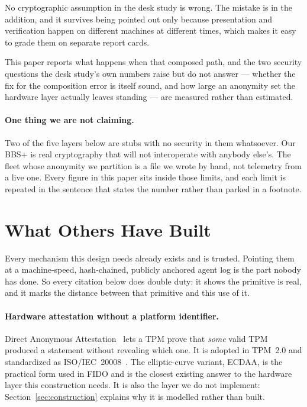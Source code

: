 \documentclass[11pt]{article}
\begin{document}
No cryptographic assumption in the desk study is wrong. The mistake is in the
addition, and it survives being pointed out only because presentation and
verification happen on different machines at different times, which makes it
easy to grade them on separate report cards.

This paper reports what happens when that composed path, and the two
security questions the desk study's own numbers raise but do not answer ---
whether the fix for the composition error is itself sound, and how large an
anonymity set the hardware layer actually leaves standing --- are measured
rather than estimated.

\paragraph{One thing we are not claiming.} Two of the five layers below are
stubs with no security in them whatsoever. Our BBS+ is real cryptography that
will not interoperate with anybody else's. The fleet whose anonymity we
partition is a file we wrote by hand, not telemetry from a live one. Every
figure in this paper sits inside those limits, and each limit is repeated in
the sentence that states the number rather than parked in a footnote.

\section{What Others Have Built}
\label{sec:related}

Every mechanism this design needs already exists and is trusted. Pointing
them at a machine-speed, hash-chained, publicly anchored agent log is the
part nobody has done. So every citation below does double duty: it shows the
primitive is real, and it marks the distance between that primitive and this
use of it.

\paragraph{Hardware attestation without a platform identifier.} Direct
Anonymous Attestation~\cite{daa} lets a TPM prove that \emph{some} valid TPM
produced a statement without revealing which one. It is adopted in TPM~2.0
and standardized as ISO/IEC~20008~\cite{iso20008}. The elliptic-curve
variant, ECDAA, is the practical form used in FIDO and is the closest
existing answer to the hardware layer this construction needs. It is also
the layer we do not implement: Section~\ref{sec:construction} explains why
it is modelled rather than built.
\end{document}
